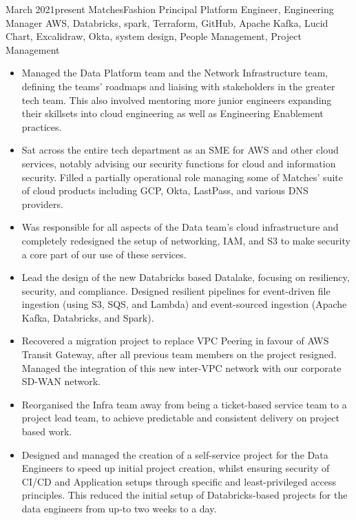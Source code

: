\documentclass[10pt]{article} %
\begin{document}
\jobheader
{March 2021}{present}
{MatchesFashion}
{Principal Platform Engineer, Engineering Manager}
{
      AWS, Databricks, spark, Terraform, GitHub, Apache Kafka, Lucid Chart, Excalidraw,
      Okta, system design, People Management, Project Management
}
{
  \begin{itemize}
      \item Managed the Data Platform team and the Network Infrastructure team, defining
            the teams' roadmaps and liaising with stakeholders in the greater tech team.
            This also involved mentoring more junior engineers expanding their skillsets
            into cloud engineering as well as Engineering Enablement practices.

      \item Sat across the entire tech department as an SME for AWS and other cloud services,
            notably advising our security functions for cloud and information security.
            Filled a partially operational role managing some of Matches'
            suite of cloud products including GCP, Okta, LastPass, and various DNS providers.

      \item Was responsible for all aspects of the Data team's cloud infrastructure and completely
            redesigned the setup of networking, IAM, and S3 to make security a core part of our use
            of these services.

      \item Lead the design of the new Databricks based Datalake, focusing on resiliency, security,
            and compliance. Designed resilient pipelines for event-driven file ingestion (using S3, SQS,
            and Lambda) and event-sourced ingestion (Apache Kafka, Databricks, and Spark).

      \item Recovered a migration project to replace VPC Peering in favour of AWS Transit Gateway,
            after all previous team members on the project resigned. Managed the integration of this
            new inter-VPC network with our corporate SD-WAN network.

      \item Reorganised the Infra team away from being a ticket-based service team to a project lead team,
            to achieve predictable and consistent delivery on project based work.

      \item Designed and managed the creation of a self-service project for the Data Engineers to speed up
            initial project creation, whilst ensuring security of CI/CD and Application setups through
            specific and least-privileged access principles. This reduced the initial setup of Databricks-based
            projects for the data engineers from up-to two weeks to a day.

  \end{itemize}
}
\end{document}
